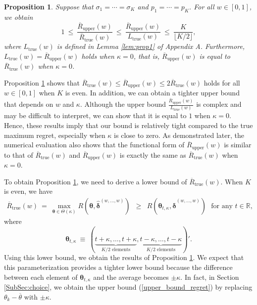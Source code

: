 \documentclass[12pt,a4paper]{article}
\newtheorem{Proposition}{Proposition}
\begin{document}
\begin{Proposition}\label{prop:tightness}
Suppose that $\sigma_1 = \cdots = \sigma_K$ and $p_1 = \cdots = p_K$. For all $w \in [0,1]$, we obtain
\begin{equation}
1 \ \leq \ \frac{\overline{R}_{\mathrm{upper}}(w)}{\overline{R}_{\mathrm{true}}(w)} \ \leq \ \frac{\overline{R}_{\mathrm{upper}}(w)}{L_{\mathrm{true}}(w)} \ \leq \ \frac{K}{\lfloor K/2 \rfloor}, \label{tight_upper}
\end{equation}
where $L_{\mathrm{true}}(w)$ is defined in Lemma \ref{lem:prop1} of Appendix A. Furthermore, $L_{\mathrm{true}}(w) = \overline{R}_{\mathrm{upper}}(w)$ holds when $\kappa = 0$, that is, $\overline{R}_{\mathrm{upper}}(w)$ is equal to $\overline{R}_{\mathrm{true}}(w)$ when $\kappa = 0$.
\end{Proposition}

Proposition \ref{prop:tightness} shows that $\overline{R}_{\mathrm{true}}(w) \leq \overline{R}_{\mathrm{upper}}(w) \leq 2 \overline{R}_{\mathrm{true}}(w)$ holds for all $w \in [0,1]$ when $K$ is even. In addition, we can obtain a tighter upper bound that depends on $w$ and $\kappa$. Although the upper bound $\frac{\overline{R}_{\mathrm{upper}}(w)}{L_{\mathrm{true}}(w)}$ is complex and may be difficult to interpret, we can show that it is equal to $1$ when $\kappa=0$. Hence, these results imply that our bound is relatively tight compared to the true maximum regret, especially when $\kappa$ is close to zero. As demonstrated later, the numerical evaluation also shows that the functional form of $\overline{R}_{\mathrm{upper}}(w)$ is similar to that of $\overline{R}_{\mathrm{true}}(w)$ and $\overline{R}_{\mathrm{upper}}(w)$ is exactly the same as $\overline{R}_{\mathrm{true}}(w)$ when $\kappa = 0$.

To obtain Proposition \ref{prop:tightness}, we need to derive a lower bound of $\overline{R}_{\mathrm{true}}(w)$. When $K$ is even, we have
\begin{eqnarray*}
\overline{R}_{\mathrm{true}}(w) \ = \ \max_{\bm{\theta} \in \Theta(\kappa)} R(\bm{\theta},\hat{\bm{\delta}}^{(w,\ldots,w)}) & \geq & R(\bm{\theta}_{t,\kappa},\hat{\bm{\delta}}^{(w,\ldots,w)}) \ \ \ \text{for any $t \in \mathbb{R}$,}
\end{eqnarray*}
where
$$
\bm{\theta}_{t,\kappa} \ \equiv \ (\underbrace{t+\kappa, \ldots, t+\kappa}_{\text{$K/2$ elements}}, \underbrace{t-\kappa, \ldots, t-\kappa}_{\text{$K/2$ elements}})'.
$$
Using this lower bound, we obtain the results of Proposition \ref{prop:tightness}. We expect that this parameterization provides a tighter lower bound because the difference between each element of $\bm{\theta}_{t,\kappa}$ and the average becomes $\pm \kappa$. In fact, in Section \ref{SubSec:choice}, we obtain the upper bound (\ref{upper_bound_regret}) by replacing $\theta_k - \overline{\theta}$ with $\pm \kappa$.
\end{document}
